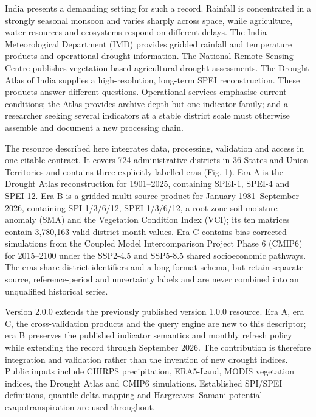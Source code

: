 \documentclass[11pt,a4paper]{article}
\begin{document}
India presents a demanding setting for such a record. Rainfall is concentrated in a strongly seasonal monsoon and varies sharply across space, while agriculture, water resources and ecosystems respond on different delays. The India Meteorological Department (IMD) provides gridded rainfall and temperature products\citep{Pai2014,Srivastava2009} and operational drought information. The National Remote Sensing Centre publishes vegetation-based agricultural drought assessments. The Drought Atlas of India supplies a high-resolution, long-term SPEI reconstruction\citep{Chuphal2024,ChuphalData2024}. These products answer different questions. Operational services emphasise current conditions; the Atlas provides archive depth but one indicator family; and a researcher seeking several indicators at a stable district scale must otherwise assemble and document a new processing chain.

The resource described here integrates data, processing, validation and access in one citable contract. It covers 724 administrative districts in 36 States and Union Territories and contains three explicitly labelled eras (Fig. 1). Era A is the Drought Atlas reconstruction for 1901--2025, containing SPEI-1, SPEI-4 and SPEI-12. Era B is a gridded multi-source product for January 1981--September 2026, containing SPI-1/3/6/12, SPEI-1/3/6/12, a root-zone soil moisture anomaly (SMA) and the Vegetation Condition Index (VCI); its ten matrices contain 3,780,163 valid district-month values. Era C contains bias-corrected simulations from the Coupled Model Intercomparison Project Phase 6 (CMIP6) for 2015--2100 under the SSP2-4.5 and SSP5-8.5 shared socioeconomic pathways. The eras share district identifiers and a long-format schema, but retain separate source, reference-period and uncertainty labels and are never combined into an unqualified historical series.

Version 2.0.0 extends the previously published version 1.0.0 resource\citep{DeshmukhV1Data2026}. Era A, era C, the cross-validation products and the query engine are new to this descriptor; era B preserves the published indicator semantics and monthly refresh policy while extending the record through September 2026. The contribution is therefore integration and validation rather than the invention of new drought indices. Public inputs include CHIRPS precipitation\citep{Funk2015}, ERA5-Land\citep{MunozSabater2021}, MODIS vegetation indices\citep{Didan2015}, the Drought Atlas\citep{ChuphalData2024} and CMIP6 simulations\citep{Eyring2016,ONeill2016}. Established SPI/SPEI definitions, quantile delta mapping\citep{Cannon2015} and Hargreaves--Samani potential evapotranspiration\citep{HargreavesSamani1985} are used throughout.
\end{document}
